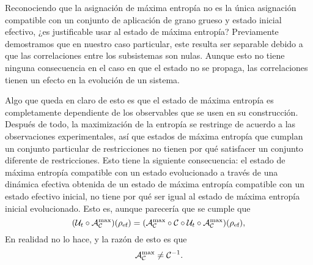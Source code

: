 Reconociendo que la asignación de máxima entropía no es la única asignación compatible con un conjunto de aplicación de grano grueso y estado inicial efectivo, ¿es justificable usar al estado de máxima entropía? Previamente demostramos que en nuestro caso particular, este resulta ser separable debido a que las correlaciones entre los subsistemas son nulas. Aunque esto no tiene ninguna consecuencia en el caso en que el estado no se propaga, las correlaciones tienen un efecto en la evolución de un sistema.

Algo que queda en claro de esto es que el estado de máxima entropía es completamente dependiente de los observables que se usen en su construcción. Después de todo, la maximización de la entropía se restringe de acuerdo a las observaciones experimentales, así que estados de máxima entropía que cumplan un conjunto particular de restricciones no tienen por qué satisfacer un conjunto diferente de restricciones. Esto tiene la siguiente consecuencia: el estado de máxima entropía compatible con un estado evolucionado a través de una dinámica efectiva obtenida de un estado de máxima entropía compatible con un estado efectivo inicial, no tiene por qué ser igual al estado de máxima entropía inicial evolucionado. Esto es, aunque parecería que se cumple que
\begin{equation}
    (\mathcal{U}_{t}\circ\mathcal{A}_{\mathcal{C}}^{\max})(\rho_{\text{ef}}) = (\mathcal{A}_{\mathcal{C}}^{\max}\circ\mathcal{C} \circ \mathcal{U}_t \circ \mathcal{A}_{\mathcal{C}}^{\max})(\rho_{\text{ef}}),\nonumber
\end{equation}
En realidad no lo hace, y la razón de esto es que
\begin{equation}
    \mathcal{A}_{\mathcal{C}}^{\max}\neq\mathcal{C}^{-1}.\nonumber
\end{equation}

